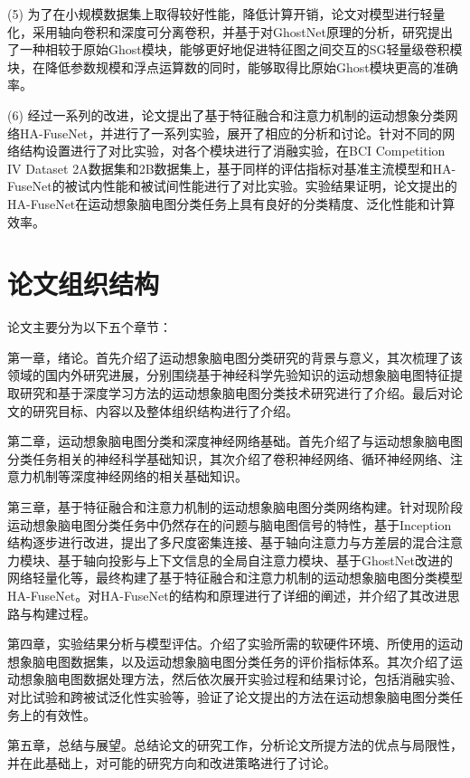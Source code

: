 (5) 为了在小规模数据集上取得较好性能，降低计算开销，论文对模型进行轻量化，采用轴向卷积和深度可分离卷积，并基于对GhostNet原理的分析，研究提出了一种相较于原始Ghost模块，能够更好地促进特征图之间交互的SG轻量级卷积模块，在降低参数规模和浮点运算数的同时，能够取得比原始Ghost模块更高的准确率。

(6) 经过一系列的改进，论文提出了基于特征融合和注意力机制的运动想象分类网络HA-FuseNet，并进行了一系列实验，展开了相应的分析和讨论。针对不同的网络结构设置进行了对比实验，对各个模块进行了消融实验，在BCI Competition IV Dataset 2A数据集和2B数据集上，基于同样的评估指标对基准主流模型和HA-FuseNet的被试内性能和被试间性能进行了对比实验。实验结果证明，论文提出的HA-FuseNet在运动想象脑电图分类任务上具有良好的分类精度、泛化性能和计算效率。

\section{论文组织结构}

论文主要分为以下五个章节：

第一章，绪论。首先介绍了运动想象脑电图分类研究的背景与意义，其次梳理了该领域的国内外研究进展，分别围绕基于神经科学先验知识的运动想象脑电图特征提取研究和基于深度学习方法的运动想象脑电图分类技术研究进行了介绍。最后对论文的研究目标、内容以及整体组织结构进行了介绍。

第二章，运动想象脑电图分类和深度神经网络基础。首先介绍了与运动想象脑电图分类任务相关的神经科学基础知识，其次介绍了卷积神经网络、循环神经网络、注意力机制等深度神经网络的相关基础知识。

第三章，基于特征融合和注意力机制的运动想象脑电图分类网络构建。针对现阶段运动想象脑电图分类任务中仍然存在的问题与脑电图信号的特性，基于Inception结构逐步进行改进，提出了多尺度密集连接、基于轴向注意力与方差层的混合注意力模块、基于轴向投影与上下文信息的全局自注意力模块、基于GhostNet改进的网络轻量化等，最终构建了基于特征融合和注意力机制的运动想象脑电图分类模型HA-FuseNet。对HA-FuseNet的结构和原理进行了详细的阐述，并介绍了其改进思路与构建过程。

第四章，实验结果分析与模型评估。介绍了实验所需的软硬件环境、所使用的运动想象脑电图数据集，以及运动想象脑电图分类任务的评价指标体系。其次介绍了运动想象脑电图数据处理方法，然后依次展开实验过程和结果讨论，包括消融实验、对比试验和跨被试泛化性实验等，验证了论文提出的方法在运动想象脑电图分类任务上的有效性。

第五章，总结与展望。总结论文的研究工作，分析论文所提方法的优点与局限性，并在此基础上，对可能的研究方向和改进策略进行了讨论。